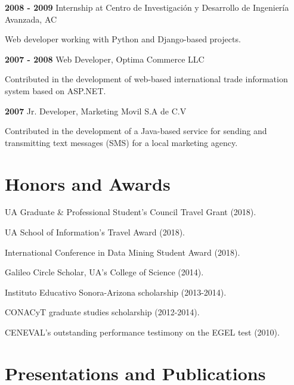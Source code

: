 \documentclass[letterpaper]{article}
\renewenvironment{itemize}{
  \begin{list}{}{
    \setlength{\leftmargin}{1.5em}
  }
}{
  \end{list}
}
\begin{document}
\begin{itemize}
\begin{itemize}
\end{itemize}
\item \textbf{2008 - 2009} Internship at {\small Centro de Investigaci\'{o}n y Desarrollo de Ingenier\'{i}a Avanzada, AC}
\item \begin{itemize}
\item Web developer working with Python and Django-based projects.
\end{itemize}
\item \textbf{2007 - 2008} Web Developer, Optima Commerce LLC
\item \begin{itemize}
\item Contributed in the development of web-based international trade information system based on ASP.NET.
\end{itemize}
\item \textbf{2007} Jr. Developer, Marketing Movil S.A de C.V
\item \begin{itemize}
\item Contributed in the development of a Java-based service for sending and transmitting text messages (SMS) for a local marketing agency.
\end{itemize}
\end{itemize}


\section*{Honors and Awards}
\begin{itemize}
	\item UA Graduate \& Professional Student's Council Travel Grant (2018).
	\item UA School of Information's Travel Award (2018).
	\item International Conference in Data Mining Student Award (2018).
	\item Galileo Circle Scholar, UA's College of Science (2014).
	\item Instituto Educativo Sonora-Arizona scholarship (2013-2014).
	\item CONACyT graduate studies scholarship (2012-2014).
	\item CENEVAL's outstanding performance testimony on the EGEL test (2010). 
\end{itemize}


\section*{Presentations and Publications}
\end{document}
